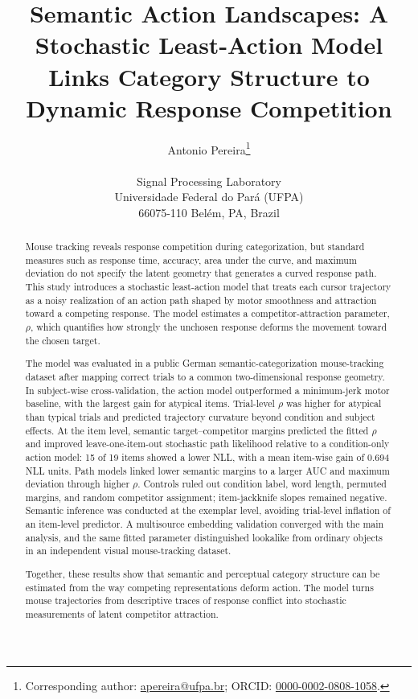 \documentclass[11pt,final]{article}
\title{Semantic Action Landscapes: A Stochastic Least-Action Model Links Category Structure to Dynamic Response Competition}
\author{%
Antonio Pereira\thanks{Corresponding author: \href{mailto:apereira@ufpa.br}{apereira@ufpa.br}; ORCID: \href{https://orcid.org/0000-0002-0808-1058}{0000-0002-0808-1058}.}\\[0.4em]
\parbox{0.82\textwidth}{\centering
Signal Processing Laboratory\\
Universidade Federal do Par\'a (UFPA)\\
66075-110 Bel\'em, PA, Brazil}}
\date{}
\begin{document}
\maketitle

\begin{abstract}
Mouse tracking reveals response competition during categorization, but standard measures such as response time, accuracy, area under the curve, and maximum deviation do not specify the latent geometry that generates a curved response path. This study introduces a stochastic least-action model that treats each cursor trajectory as a noisy realization of an action path shaped by motor smoothness and attraction toward a competing response. The model estimates a competitor-attraction parameter, $\rho$, which quantifies how strongly the unchosen response deforms the movement toward the chosen target.

The model was evaluated in a public German semantic-categorization mouse-tracking dataset after mapping correct trials to a common two-dimensional response geometry. In subject-wise cross-validation, the action model outperformed a minimum-jerk motor baseline, with the largest gain for atypical items. Trial-level $\rho$ was higher for atypical than typical trials and predicted trajectory curvature beyond condition and subject effects. At the item level, semantic target--competitor margins predicted the fitted $\rho$ and improved leave-one-item-out stochastic path likelihood relative to a condition-only action model: 15 of 19 items showed a lower NLL, with a mean item-wise gain of 0.694 NLL units. Path models linked lower semantic margins to a larger AUC and maximum deviation through higher $\rho$. Controls ruled out condition label, word length, permuted margins, and random competitor assignment; item-jackknife slopes remained negative. Semantic inference was conducted at the exemplar level, avoiding trial-level inflation of an item-level predictor. A multisource embedding validation converged with the main analysis, and the same fitted parameter distinguished lookalike from ordinary objects in an independent visual mouse-tracking dataset.

Together, these results show that semantic and perceptual category structure can be estimated from the way competing representations deform action. The model turns mouse trajectories from descriptive traces of response conflict into stochastic measurements of latent competitor attraction.
\end{abstract}
\end{document}
